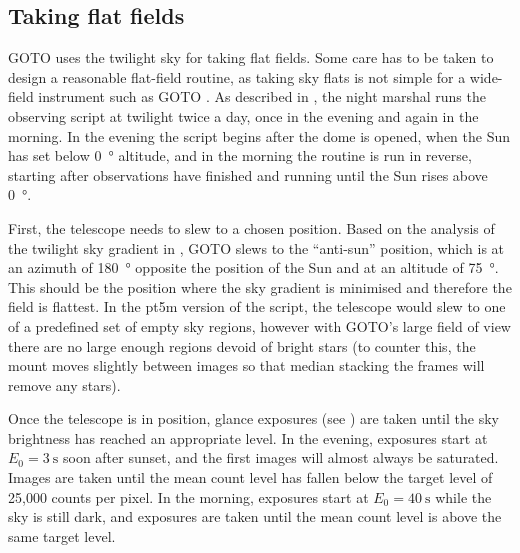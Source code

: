 
\subsection{Taking flat fields}
\label{sec:flats}
\begin{colsection}

GOTO uses the twilight sky for taking flat fields. Some care has to be taken to design a reasonable flat-field routine, as taking sky flats is not simple for a wide-field instrument such as GOTO \citep{flats3, flats2}. As described in , the night marshal runs the  observing script at twilight twice a day, once in the evening and again in the morning. In the evening the script begins after the dome is opened, when the Sun has set below \SI{0}{\degree} altitude, and in the morning the routine is run in reverse, starting after observations have finished and running until the Sun rises above \SI{0}{\degree}.

First, the telescope needs to slew to a chosen position. Based on the analysis of the twilight sky gradient in \citet{flats}, GOTO slews to the ``anti-sun'' position, which is at an azimuth of \SI{180}{\degree} opposite the position of the Sun and at an altitude of \SI{75}{\degree}. This should be the position where the sky gradient is minimised and therefore the field is flattest. In the pt5m version of the script, the telescope would slew to one of a predefined set of empty sky regions, however with GOTO's large field of view there are no large enough regions devoid of bright stars (to counter this, the mount moves slightly between images so that median stacking the frames will remove any stars).

Once the telescope is in position, glance exposures (see ) are taken until the sky brightness has reached an appropriate level. In the evening, exposures start at $E_0=\SI{3}{\second}$ soon after sunset, and the first images will almost always be saturated. Images are taken until the mean count level has fallen below the target level of 25,000 counts per pixel. In the morning, exposures start at $E_0=\SI{40}{\second}$ while the sky is still dark, and exposures are taken until the mean count level is above the same target level.


\end{colsection}
